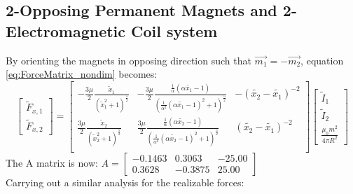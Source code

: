 \documentclass[english]{article}
\begin{document}
\subsection{2-Opposing Permanent Magnets and 2-Electromagnetic Coil system}
By orienting the magnets in opposing direction such that $\vec{m_1} = -\vec{m_2}$, equation \ref{eq:ForceMatrix_nondim} becomes: 
\begin{equation}
\begin{bmatrix}
	\tilde{F}_{x,1}\\[0.3em]
	\tilde{F}_{x,2}	
\end{bmatrix}
=
\begin{bmatrix}
			-\frac{3\mu}{2} \frac{\tilde{x}_1}{\left(\tilde{x}_1^2 + 1 \right)^{\frac{5}{2}}}  & -\frac{3\mu}{2}\frac{\frac{1}{\alpha}\left(\alpha\tilde{x_1} - 1 \right)}{\left(\frac{1}{\alpha^2}\left(\alpha \tilde{x_1} - 1 \right)^2 + 1 \right)^{\frac{5}{2}}} & -\left(\tilde{x_2}-\tilde{x_1}\right)^{-2}\\
			\frac{3\mu}{2} \frac{\tilde{x}_2}{\left(\tilde{x}_2^2 + 1 \right)^{\frac{5}{2}}}  & \frac{3\mu}{2}\frac{\frac{1}{\alpha}\left(\alpha\tilde{x_2} - 1 \right)}{\left(\frac{1}{\alpha^2}\left(\alpha \tilde{x_2} - 1 \right)^2 + 1 \right)^{\frac{5}{2}}} & 	\left(\tilde{x_2}-\tilde{x_1}\right)^{-2}\\
\end{bmatrix}
\begin{bmatrix}
	\tilde{I}_1\\ \tilde{I}_2 \\ \frac{\mu_0 m^2}{4 \pi R^2}
\end{bmatrix}
\label{eq:ForceMatrix_nondimopp}
\end{equation}
The A matrix is now:
$ A = \begin{bmatrix}-0.1463  &  0.3063 & -25.00\\
    0.3628 &  -0.3875 &  25.00
\end{bmatrix}   $\\
Carrying out a similar analysis for the realizable forces: 
\vspace{-0.1in}
\end{document}
